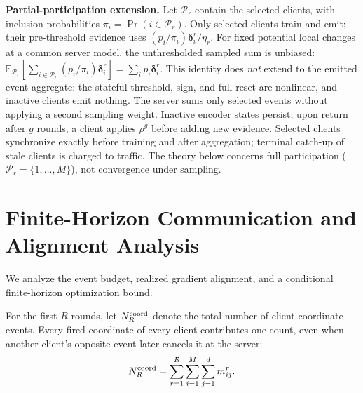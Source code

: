 \documentclass[conference]{IEEEtran}
\newcommand{\E}{\mathbb{E}}
\newcommand{\vect}[1]{\boldsymbol{#1}}
\newcommand{\rev}[1]{#1}
\newcommand{\newrev}[1]{#1}
\begin{document}
\noindent\textbf{Partial-participation extension.}
Let $\mathcal P_r$ contain the selected clients, with inclusion
probabilities $\pi_i=\Pr(i\in\mathcal P_r)$. Only selected clients
train and emit; their pre-threshold evidence uses
$(p_i/\pi_i)\vect{\delta}_i^r/\eta_r$.
For fixed potential local changes at a common server model,
the unthresholded sampled sum is unbiased:
$\E_{\mathcal P_r}[\sum_{i\in\mathcal P_r}
(p_i/\pi_i)\vect{\delta}_i^r]=\sum_i p_i\vect{\delta}_i^r$.
This identity does \emph{not} extend to the emitted event aggregate:
the stateful threshold, sign, and full reset are nonlinear,
and inactive clients emit nothing. The server sums only selected
events without applying a second sampling weight.
Inactive encoder states persist; upon return after $g$ rounds,
a client applies $\rho^g$ before adding new evidence.
Selected clients synchronize exactly before training and after
aggregation; terminal catch-up of stale clients is charged to traffic.
The theory below concerns full participation
($\mathcal P_r=\{1,\ldots,M\}$), not convergence under sampling.

\section{\rev{Finite-Horizon Communication and Alignment Analysis}}
\label{sec:theory}

\newrev{We analyze the event budget, realized gradient alignment,
and a conditional finite-horizon optimization bound.}

\newrev{For the first $R$ rounds, let $N_R^{\rm coord}$ denote the total number of
client-coordinate events. Every fired coordinate of every client contributes
one count, even when another client's opposite event later cancels it at the
server:}
\begin{equation}
 \newrev{N_R^{\rm coord}=\sum_{r=1}^R\sum_{i=1}^M\sum_{j=1}^d m_{ij}^r.}
 \label{eq:coordinate-event-count}
\end{equation}
\end{document}
